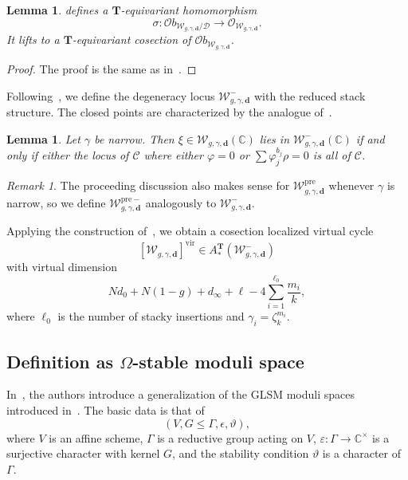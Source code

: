 \documentclass{amsart}
\newtheorem{lem}[thm]{Lemma}
\theoremstyle{definition}
\theoremstyle{remark}
\newtheorem{rmk}[thm]{Remark}
\theoremstyle{plain}
\theoremstyle{definition}
\theoremstyle{remark}
\newcommand{\C}{\mathbb{C}}
\newcommand{\T}{\mathbf{T}}
\newcommand{\bd}{\mathbf{d}}
\newcommand{\ep}{\varepsilon}
\newcommand{\mc}[1]{\mathcal{#1}}
\newcommand{\mbf}[1]{\mathbf{#1}}
\newcommand{\mr}[1]{\mathrm{#1}}
\newcommand{\1}{\mathbf{1}}
\newcommand{\2}{\mathbf{2}}
\newcommand{\3}{\mathbf{3}}
\newcommand{\pre}{\mr{pre}}
\newcommand{\vir}{\mr{vir}}
\begin{document}
\begin{lem}
     defines a $\T$-equivariant homomorphism 
    \[ \sigma \colon \mc{O}b_{\mc{W}_{g,\gamma,\mbf{d}}/\mc{D}} \to \mc{O}_{\mc{W}_{g,\gamma,\mbf{d}}}. \] 
    It lifts to a $\T$-equivariant cosection of $\mc{O}b_{\mc{W}_{g,\gamma,\mbf{d}}}$.
\end{lem}

\begin{proof}
    The proof is the same as in~\cite[Lemma 2.7]{nmsp}.
\end{proof}

Following~\cite{nmsp,mspfermat}, we define the degeneracy locus $\mc{W}^-_{g,\gamma,\mbf{d}}$ with the reduced stack structure. The closed points are characterized by the analogue of~\cite[Lemma 2.13]{mspfermat}.

\begin{lem}
    Let $\gamma$ be narrow. Then $\xi \in \mc{W}_{g,\gamma,\mbf{d}}(\C)$ lies in $\mc{W}_{g,\gamma,\bd}^-(\C)$ if and only if either the locus of $\mc{C}$ where either $\varphi = 0$ or $\sum \varphi_j^{b_j} \rho = 0$ is all of $\mc{C}$.
\end{lem}

\begin{rmk}
    The proceeding discussion also makes sense for $\mc{W}^{\pre}_{g,\gamma,\bd}$ whenever $\gamma$ is narrow, so we define $\mc{W}^{\pre-}_{g,\gamma,\mbf{d}}$ analogously to $\mc{W}^-_{g,\gamma,\mbf{d}}$.
\end{rmk}

Applying the construction of~\cite{cosection}, we obtain a cosection localized virtual cycle
\[ [\mc{W}_{g,\gamma,\mbf{d}}]^{\vir} \in A_*^{\T}(\mc{W}^-_{g,\gamma,\mbf{d}}) \]
with virtual dimension
\[ N d_0 + N(1-g) + d_{\infty} + \ell - 4 \sum_{i=1}^{\ell_0} \frac{m_i}{k}, \]
where $\ell_0$ is the number of stacky insertions and $\gamma_i = \zeta_k^{m_i}$.

\subsection{Definition as $\Omega$-stable moduli space}
\label{subsec:omega stable}

In~\cite{generalmsp}, the authors introduce a generalization of the GLSM moduli spaces introduced in~\cite{glsm}. The basic data is that of
\[ (V, G \leq \Gamma, \epsilon, \vartheta), \]
where $V$ is an affine scheme, $\Gamma$ is a reductive group acting on $V$, $\ep \colon \Gamma \to \C^{\times}$ is a surjective character with kernel $G$, and the stability condition $\vartheta$ is a character of $\Gamma$.
\end{document}
